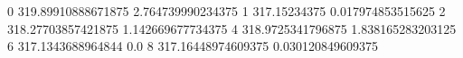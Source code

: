 0 319.89910888671875 2.764739990234375
1 317.15234375 0.017974853515625
2 318.27703857421875 1.142669677734375
4 318.9725341796875 1.838165283203125
6 317.1343688964844 0.0
8 317.16448974609375 0.030120849609375
